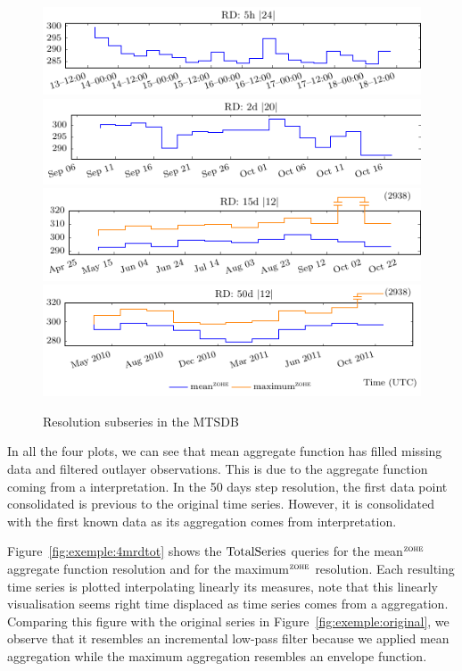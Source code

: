 \begin{figure}[tp]
  \centering
  \includegraphics{fig_exemple_4mrd1.pdf}
  \includegraphics{fig_exemple_4mrd2.pdf}
  \includegraphics{fig_exemple_4mrd3.pdf}
  \includegraphics{fig_exemple_4mrd4.pdf}
  \caption{Resolution subseries in the MTSDB}
  \label{fig:exemple:4mrd}
\end{figure}

In all the four plots, we can see that mean aggregate function has
filled missing data and filtered outlayer observations. This is due to
the aggregate function coming from a \zohe{} interpretation.  In the
50 days step resolution, the first data point consolidated is previous
to the original time series. However, it is consolidated with the
first known data as its aggregation comes from \zohe{} interpretation.

Figure~\ref{fig:exemple:4mrdtot} shows the $\operatorname{TotalSeries}$
queries for the mean$^{\zohe}$ aggregate function resolution and for
the maximum$^{\zohe}$ resolution.  Each resulting time series is
plotted interpolating linearly its measures, note that this linearly
visualisation seems right time displaced as time series comes from a
\zohe{} aggregation.  Comparing this figure with the original series
in Figure~\ref{fig:exemple:original}, we observe that it resembles an
incremental low-pass filter because we applied mean aggregation while
the maximum aggregation resembles an envelope function.

